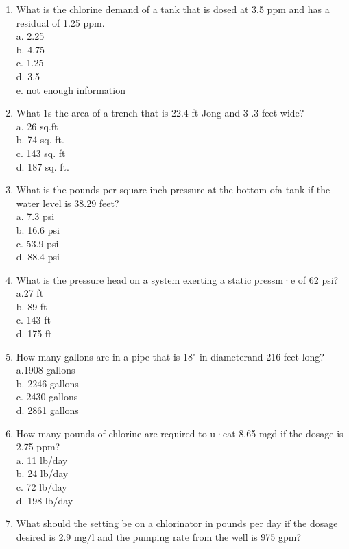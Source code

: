 \begin{enumerate}
\item What is the chlorine demand of a tank that is dosed at 3.5 ppm and has a residual of 1.25 ppm.\\
a. 2.25 \\
b. 4.75 \\
c. 1.25 \\
d. 3.5 \\
e. not enough information\\
\item What 1s the area of a trench that is 22.4 ft Jong and 3 .3 feet wide?\\
a. 26 sq.ft\\
b. 74 sq. ft.\\
c. 143 sq. ft\\
d. 187 sq. ft.\\
\item What is the pounds per square inch pressure at the bottom ofa tank if the water level is 38.29 feet?\\
a. 7.3 psi\\
b. 16.6 psi\\
c. 53.9 psi \\
d. 88.4 psi\\
\item What is the pressure head on a system exerting a static pressm·e of 62 psi?\\
a.27 ft\\
b. 89 ft\\
c. 143 ft\\
d. 175 ft\\
\item How many gallons are in a pipe that is 18" in diameterand 216 feet long?\\
a.1908 gallons\\
b. 2246 gallons\\
c. 2430 gallons \\
d. 2861 gallons\\
\item How many pounds of chlorine are required to u·eat 8.65 mgd if the dosage is 2.75 ppm?\\
a. 11 lb/day\\
b. 24 lb/day\\
c. 72 lb/day\\
d. 198 lb/day\\
\item What should the setting be on a chlorinator in pounds per day if the dosage desired is 2.9 mg/l and the pumping rate from the well is 975 gpm?\\

\end{enumerate}

